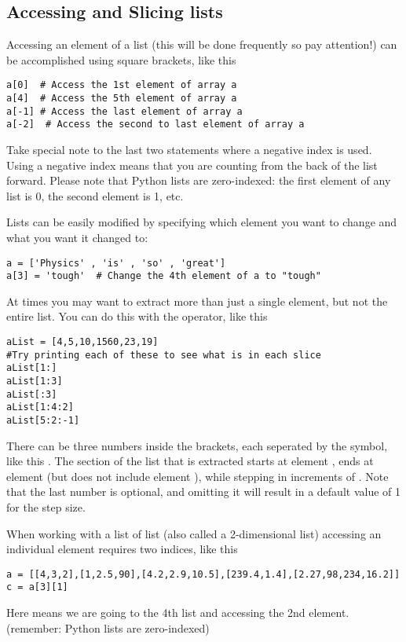 \subsection*{Accessing and Slicing lists}
Accessing an element of a list (this will be done frequently so pay
attention!) can be accomplished using square brackets, like this
\begin{Verbatim}
a[0]  # Access the 1st element of array a
a[4]  # Access the 5th element of array a
a[-1] # Access the last element of array a
a[-2]  # Access the second to last element of array a
\end{Verbatim}
Take special note to the last two statements where a negative index is
used.  Using a negative index means that you are counting from the
back of the list forward.
Please note that Python lists are zero-indexed: the first element of
any list is 0, the second element is 1, etc.

Lists can be easily
modified by specifying which element you want to change and what you
want it changed to:
\begin{Verbatim}
a = ['Physics' , 'is' , 'so' , 'great']
a[3] = 'tough'  # Change the 4th element of a to "tough"
\end{Verbatim}
At times you may want to extract more than just a single element, but
not the entire list.  You can do this with the \code{:} operator, like
this
\begin{Verbatim}
aList = [4,5,10,1560,23,19]
#Try printing each of these to see what is in each slice
aList[1:]
aList[1:3]
aList[:3]
aList[1:4:2]
aList[5:2:-1]
\end{Verbatim}
There can be three numbers inside the brackets, each seperated by the
\code{:} symbol, like this \code{[x:y:z]}.  The section of the
list that is extracted starts at element , ends at element
 (but does not include element ), while stepping in
increments of .  Note that the last number is optional, and
omitting it will result in a default value of 1 for the step size.


When working with a list of list (also called a 2-dimensional list)
accessing an individual element requires two indices, like this
\begin{Verbatim}
a = [[4,3,2],[1,2.5,90],[4.2,2.9,10.5],[239.4,1.4],[2.27,98,234,16.2]]
c = a[3][1]
\end{Verbatim}
Here \code{[3][1]} means we are going to the 4th list and accessing the 2nd element. (remember: Python lists are zero-indexed)

